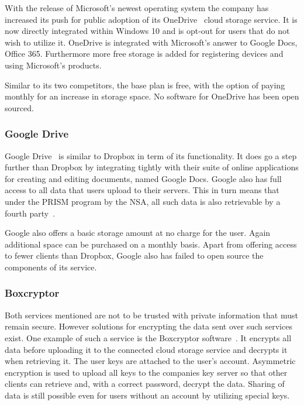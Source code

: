 With the release of Microsoft's newest operating system the company has increased its push for public adoption of its OneDrive~\cite{web:site:onedrive} cloud storage service.
It is now directly integrated within Windows 10 and is opt-out for users that do not wish to utilize it.
OneDrive is integrated with Microsoft's answer to Google Docs, Office 365.
Furthermore more free storage is added for registering devices and using Microsoft's products.

Similar to its two competitors, the base plan is free, with the option of paying monthly for an increase in storage space.
No software for OneDrive has been open sourced.

\subsubsection{Google Drive}
\label{subs:Google Drive}

Google Drive~\cite{web:site:gdrive} is similar to Dropbox in term of its functionality.
It does go a step further than Dropbox by integrating tightly with their suite of online applications for creating and editing documents, named Google Docs.
Google also has full access to all data that users upload to their servers.
This in turn means that under the PRISM program by the NSA, all such data is also retrievable by a fourth party~\cite{web:site:rt:google}.

Google also offers a basic storage amount at no charge for the user.
Again additional space can be purchased on a monthly basis.
Apart from offering access to fewer clients than Dropbox, Google also has failed to open source the components of its service.

\subsubsection{Boxcryptor}
\label{subs:Boxcryptor}

Both services mentioned are not to be trusted with private information that must remain secure.
However solutions for encrypting the data sent over such services exist.
One example of such a service is the Boxcryptor software~\cite{web:site:boxcryptor}.
It encrypts all data before uploading it to the connected cloud storage service and decrypts it when retrieving it.
The user keys are attached to the user's account.
Asymmetric encryption is used to upload all keys to the companies key server so that other clients can retrieve and, with a correct password, decrypt the data.
Sharing of data is still possible even for users without an account by utilizing special keys.

